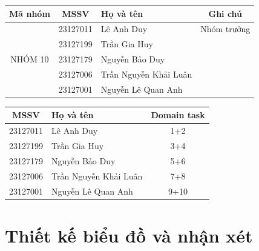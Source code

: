 \documentclass[12pt,a4paper]{article}
\begin{document}
\begin{table}[H]
\centering
\begin{tabular}{|c|c|l|c|}
\hline
\textbf{Mã nhóm} & \textbf{MSSV} & \textbf{Họ và tên} & \textbf{Ghi chú} \\ \hline
\multirow{5}{*}{NHÓM 10} & 23127011 & Lê Anh Duy & Nhóm trưởng \\ \cline{2-4} 
                         & 23127199 & Trần Gia Huy &  \\ \cline{2-4} 
                         & 23127179 & Nguyễn Bảo Duy &  \\ \cline{2-4} 
                         & 23127006 & Trần Nguyễn Khải Luân &  \\ \cline{2-4} 
                         & 23127001 & Nguyễn Lê Quan Anh &  \\ \hline
\end{tabular}
\end{table}

\vspace{1em}

\begin{table}[H]
\centering
\begin{tabular}{|c|l|c|}
\hline
\textbf{MSSV} & \textbf{Họ và tên} & \textbf{Domain task} \\ \hline
23127011 & Lê Anh Duy & 1+2 \\ \hline
23127199 & Trần Gia Huy & 3+4 \\ \hline
23127179 & Nguyễn Bảo Duy & 5+6 \\ \hline
23127006 & Trần Nguyễn Khải Luân & 7+8 \\ \hline
23127001 & Nguyễn Lê Quan Anh & 9+10 \\ \hline
\end{tabular}
\end{table}

\newpage





\section{Thiết kế biểu đồ và nhận xét}























\appendix

\end{document}
